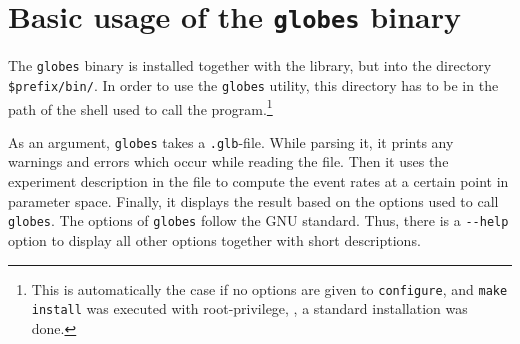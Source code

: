 \section{Basic usage of the {\tt globes} binary}
\label{sec:globes_basics}

The {\tt globes} binary is installed 
together with the library, but
into the directory {\tt \$prefix/bin/}. In order to use the {\tt globes} 
utility, this directory has to be in the path of the shell used to call the program.\footnote{This is automatically the case if
no options are given to {\tt configure}, and {\tt make install} was 
executed with root-privilege, \ie, a standard installation was done.}

As an argument, {\tt globes} takes a {\tt .glb}-file. While parsing it,
it prints any warnings and errors which occur while reading the file. Then it uses the experiment description in the file to compute the event rates at a certain point in parameter space. Finally, it displays the result based on the options used to call {\tt globes}. 
The options of {\tt globes} follow the GNU standard. Thus, there
is a {\tt \verb+--+help} option to display all other options 
together with short descriptions.


